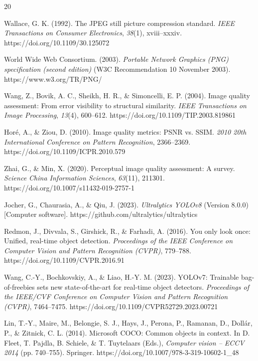 \documentclass[12pt, a4paper]{article}
\begin{document}
\begin{thebibliography}{20}

Wallace, G. K. (1992). The JPEG still picture compression standard. \textit{IEEE Transactions on Consumer Electronics}, \textit{38}(1), xviii–xxxiv. https://doi.org/10.1109/30.125072

World Wide Web Consortium. (2003). \textit{Portable Network Graphics (PNG) specification (second edition)} (W3C Recommendation 10 November 2003). https://www.w3.org/TR/PNG/

Wang, Z., Bovik, A. C., Sheikh, H. R., \& Simoncelli, E. P. (2004). Image quality assessment: From error visibility to structural similarity. \textit{IEEE Transactions on Image Processing}, \textit{13}(4), 600–612. https://doi.org/10.1109/TIP.2003.819861

Horé, A., \& Ziou, D. (2010). Image quality metrics: PSNR vs. SSIM. \textit{2010 20th International Conference on Pattern Recognition}, 2366–2369. https://doi.org/10.1109/ICPR.2010.579

Zhai, G., \& Min, X. (2020). Perceptual image quality assessment: A survey. \textit{Science China Information Sciences}, \textit{63}(11), 211301. https://doi.org/10.1007/s11432-019-2757-1

Jocher, G., Chaurasia, A., \& Qiu, J. (2023). \textit{Ultralytics YOLOv8} (Version 8.0.0) [Computer software]. https://github.com/ultralytics/ultralytics

Redmon, J., Divvala, S., Girshick, R., \& Farhadi, A. (2016). You only look once: Unified, real-time object detection. \textit{Proceedings of the IEEE Conference on Computer Vision and Pattern Recognition (CVPR)}, 779–788. https://doi.org/10.1109/CVPR.2016.91

Wang, C.-Y., Bochkovskiy, A., \& Liao, H.-Y. M. (2023). YOLOv7: Trainable bag-of-freebies sets new state-of-the-art for real-time object detectors. \textit{Proceedings of the IEEE/CVF Conference on Computer Vision and Pattern Recognition (CVPR)}, 7464–7475. https://doi.org/10.1109/CVPR52729.2023.00721

Lin, T.-Y., Maire, M., Belongie, S. J., Hays, J., Perona, P., Ramanan, D., Dollár, P., \& Zitnick, C. L. (2014). Microsoft COCO: Common objects in context. In D. Fleet, T. Pajdla, B. Schiele, \& T. Tuytelaars (Eds.), \textit{Computer vision – ECCV 2014} (pp. 740–755). Springer. https://doi.org/10.1007/978-3-319-10602-1\_48


\end{thebibliography}
\end{document}
